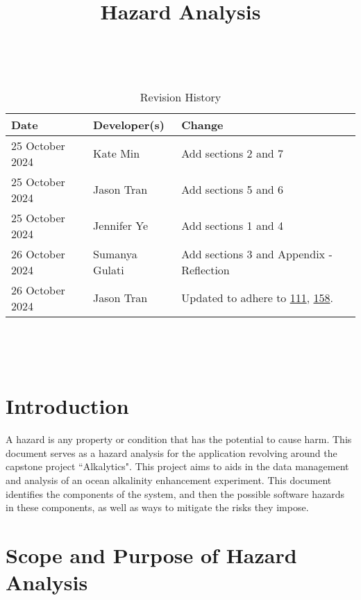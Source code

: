 \documentclass{article}
\title{Hazard Analysis\\\progname}
\author{\authname}
\date{}
\begin{document}
\maketitle
\thispagestyle{empty}

~\newpage


\begin{table}[hp]
\caption{Revision History} \label{TblRevisionHistory}
\begin{tabularx}{\textwidth}{llX}
\toprule
\textbf{Date} & \textbf{Developer(s)} & \textbf{Change}\\
\midrule
25 October 2024 & Kate Min & Add sections 2 and 7\\
25 October 2024 & Jason Tran & Add sections 5 and 6\\
25 October 2024 & Jennifer Ye & Add sections 1 and 4\\
26 October 2024 & Sumanya Gulati & Add sections 3 and Appendix - Reflection\\
26 October 2024 & Jason Tran& Updated to adhere to 
\href{https://github.com/SumanyaG/Alkalytics/issues/111}{111},
\href{https://github.com/SumanyaG/Alkalytics/issues/158}{158}. \\
\bottomrule
\end{tabularx}
\end{table}

~\newpage

\tableofcontents

~\newpage


\section{Introduction}

A hazard is any property or condition that has the potential to cause harm. This
document serves as a hazard analysis for the application revolving around the
capstone project ``Alkalytics". This project aims to aids in the data management
and analysis of an ocean alkalinity enhancement experiment. This document
identifies the components of the system, and then the possible software hazards
in these components, as well as ways to mitigate the risks they impose.

\section{Scope and Purpose of Hazard Analysis}
\end{document}
